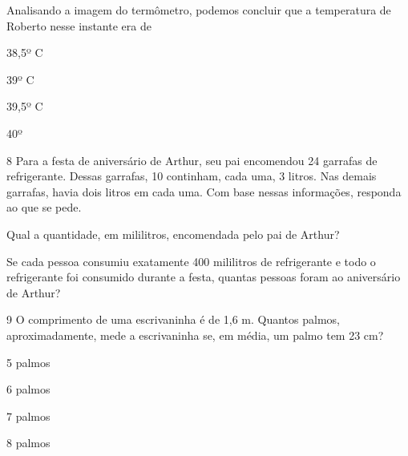 Analisando a imagem do termômetro, podemos concluir que a temperatura de Roberto nesse instante era de

\begin{minipage}{.5\textwidth}
\begin{escolha}

\item
  38,5º C
\item
  39º C
\item
  39,5º C
\item
  40º
\end{escolha}
\end{minipage}

\num{8} Para a festa de aniversário de Arthur, seu pai encomendou 24 garrafas de
refrigerante. Dessas garrafas, 10 continham, cada uma, 3 litros. Nas
demais garrafas, havia dois litros em cada uma. Com base nessas
informações, responda ao que se pede.

\begin{escolha}
\item Qual a quantidade, em mililitros, encomendada pelo pai de Arthur?

\item Se cada pessoa consumiu exatamente 400 mililitros de refrigerante e
  todo o refrigerante foi consumido durante a festa, quantas pessoas
  foram ao aniversário de Arthur?
\end{escolha}

\num{9} O comprimento de uma escrivaninha é de 1,6 m. Quantos palmos,
aproximadamente, mede a escrivaninha se, em média, um palmo tem 23 cm?

\begin{minipage}{.5\textwidth}
\begin{escolha}
\item
  5 palmos
\item
  6 palmos
\item
  7 palmos
\item
  8 palmos
\end{escolha}
\end{minipage}

